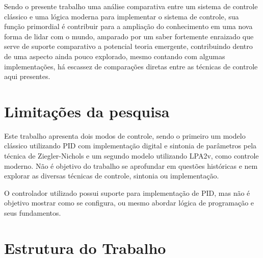 Sendo o presente trabalho uma análise comparativa entre um sistema de controle clássico e uma lógica moderna para implementar o sistema de controle, sua função primordial é contribuir para a ampliação do conhecimento em uma nova forma de lidar com o mundo, amparado por um saber fortemente enraizado que serve de suporte comparativo a potencial teoria emergente, contribuindo dentro de uma aspecto ainda pouco explorado, mesmo contando com algumas implementações, há escassez de comparações diretas entre as técnicas de controle aqui presentes.



\section{Limitações da pesquisa}


Este trabalho apresenta dois modos de controle, sendo o primeiro um modelo clássico utilizando PID com implementação digital e sintonia de parâmetros pela técnica de Ziegler-Nichols e um segundo modelo utilizando LPA2v, como controle moderno. Não é objetivo do trabalho se aprofundar em questões históricas e nem explorar as diversas técnicas de controle, sintonia ou implementação.

O controlador utilizado possui suporte para implementação de PID, mas não é objetivo mostrar como se configura, ou mesmo abordar lógica de programação e seus fundamentos.



\section{Estrutura do Trabalho}


